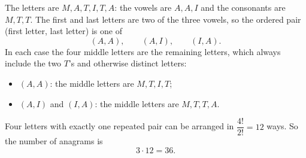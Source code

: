 The letters are $M,A,T,I,T,A$: the vowels are $A,A,I$ and the consonants are $M,T,T$. The first and last letters are two of the three vowels, so the ordered pair (first letter, last letter) is one of
\[(A,A),\qquad (A,I),\qquad (I,A).\]
In each case the four middle letters are the remaining letters, which always include the two $T$'s and otherwise distinct letters:
\begin{itemize}
\item $(A,A)$: the middle letters are $M,T,I,T$;
\item $(A,I)$ and $(I,A)$: the middle letters are $M,T,T,A$.
\end{itemize}
Four letters with exactly one repeated pair can be arranged in $\dfrac{4!}{2!}=12$ ways. So the number of anagrams is
\[3\cdot12=\boxed{36}.\]
